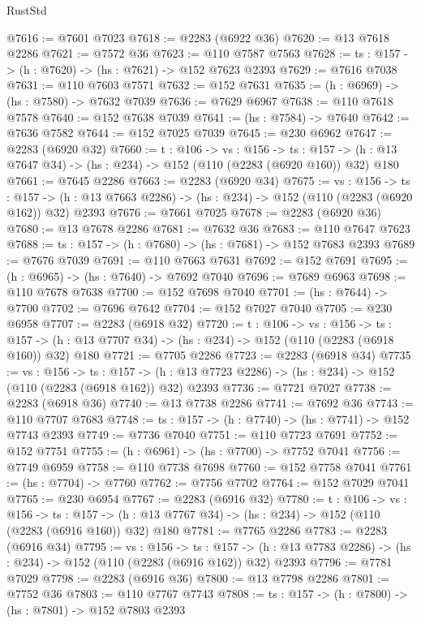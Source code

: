 \begin{lexlean}{RustStd}
\begin{coremodule}
@7616 := @7601 @7023
@7618 := @2283 (@6922 @36)
@7620 := @13 @7618 @2286
@7621 := @7572 @36
@7623 := @110 @7587 @7563
@7628 := {ts : @157} -> (h : @7620) -> (hs : @7621) -> @152 @7623 @2393
@7629 := @7616 @7038
@7631 := @110 @7603 @7571
@7632 := @152 @7631
@7635 := (h : @6969) -> (hs : @7580) -> @7632 @7039
@7636 := @7629 @6967
@7638 := @110 @7618 @7578
@7640 := @152 @7638 @7039
@7641 := (hs : @7584) -> @7640
@7642 := @7636 @7582
@7644 := @152 @7025 @7039
@7645 := @230 @6962
@7647 := @2283 (@6920 @32)
@7660 := {t : @106} ->
  {vs : @156} ->
  {ts : @157} -> (h : @13 @7647 @34) -> (hs : @234) -> @152 (@110 (@2283 (@6920 @160)) @32) @180
@7661 := @7645 @2286
@7663 := @2283 (@6920 @34)
@7675 := {vs : @156} ->
  {ts : @157} -> (h : @13 @7663 @2286) -> (hs : @234) -> @152 (@110 (@2283 (@6920 @162)) @32) @2393
@7676 := @7661 @7025
@7678 := @2283 (@6920 @36)
@7680 := @13 @7678 @2286
@7681 := @7632 @36
@7683 := @110 @7647 @7623
@7688 := {ts : @157} -> (h : @7680) -> (hs : @7681) -> @152 @7683 @2393
@7689 := @7676 @7039
@7691 := @110 @7663 @7631
@7692 := @152 @7691
@7695 := (h : @6965) -> (hs : @7640) -> @7692 @7040
@7696 := @7689 @6963
@7698 := @110 @7678 @7638
@7700 := @152 @7698 @7040
@7701 := (hs : @7644) -> @7700
@7702 := @7696 @7642
@7704 := @152 @7027 @7040
@7705 := @230 @6958
@7707 := @2283 (@6918 @32)
@7720 := {t : @106} ->
  {vs : @156} ->
  {ts : @157} -> (h : @13 @7707 @34) -> (hs : @234) -> @152 (@110 (@2283 (@6918 @160)) @32) @180
@7721 := @7705 @2286
@7723 := @2283 (@6918 @34)
@7735 := {vs : @156} ->
  {ts : @157} -> (h : @13 @7723 @2286) -> (hs : @234) -> @152 (@110 (@2283 (@6918 @162)) @32) @2393
@7736 := @7721 @7027
@7738 := @2283 (@6918 @36)
@7740 := @13 @7738 @2286
@7741 := @7692 @36
@7743 := @110 @7707 @7683
@7748 := {ts : @157} -> (h : @7740) -> (hs : @7741) -> @152 @7743 @2393
@7749 := @7736 @7040
@7751 := @110 @7723 @7691
@7752 := @152 @7751
@7755 := (h : @6961) -> (hs : @7700) -> @7752 @7041
@7756 := @7749 @6959
@7758 := @110 @7738 @7698
@7760 := @152 @7758 @7041
@7761 := (hs : @7704) -> @7760
@7762 := @7756 @7702
@7764 := @152 @7029 @7041
@7765 := @230 @6954
@7767 := @2283 (@6916 @32)
@7780 := {t : @106} ->
  {vs : @156} ->
  {ts : @157} -> (h : @13 @7767 @34) -> (hs : @234) -> @152 (@110 (@2283 (@6916 @160)) @32) @180
@7781 := @7765 @2286
@7783 := @2283 (@6916 @34)
@7795 := {vs : @156} ->
  {ts : @157} -> (h : @13 @7783 @2286) -> (hs : @234) -> @152 (@110 (@2283 (@6916 @162)) @32) @2393
@7796 := @7781 @7029
@7798 := @2283 (@6916 @36)
@7800 := @13 @7798 @2286
@7801 := @7752 @36
@7803 := @110 @7767 @7743
@7808 := {ts : @157} -> (h : @7800) -> (hs : @7801) -> @152 @7803 @2393

\end{coremodule}
\end{lexlean}
